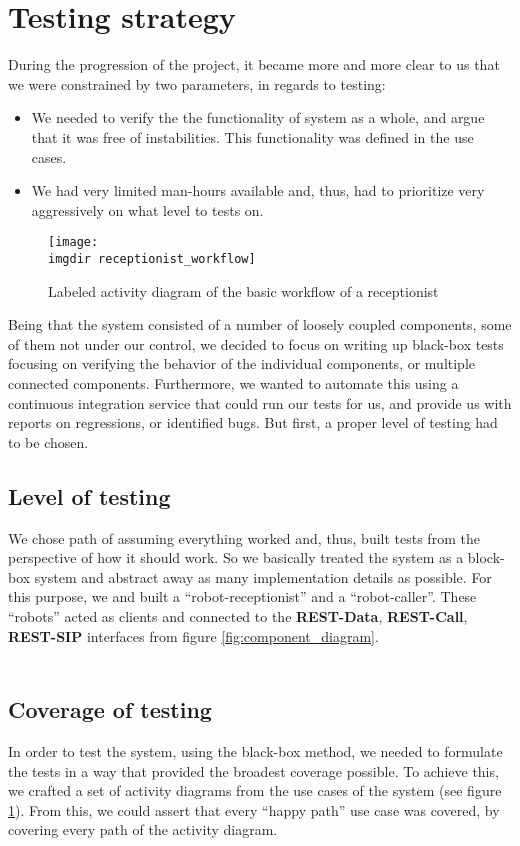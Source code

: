 \section{Testing strategy}
\label{sec:test}
During the progression of the project, it became more and more clear to us that we were constrained by two parameters, in regards to testing:
\begin{itemize}
  \item We needed to verify the the functionality of system as a whole, and argue that it was free of instabilities. This functionality was defined in the use cases.
  \item We had very limited man-hours available and, thus, had to prioritize very aggressively on what level to tests on.
\end{itemize}
\begin{figure}[ht]
\centering
\texttt{[image: \\imgdir receptionist\_workflow]}
\caption{Labeled activity diagram of the basic workflow of a receptionist}
\label{fig:receptionist_workflow}
\end{figure}
Being that the system consisted of a number of loosely coupled components, some of them not under our control, we decided to focus on writing up black-box tests focusing on verifying the behavior of the individual components, or multiple connected components.
Furthermore, we wanted to automate this using a continuous integration service that could run our tests for us, and provide us with reports on regressions, or identified bugs. But first, a proper level of testing had to be chosen.

\subsection{Level of testing}
\label{ssec:level-of-testing}
We chose path of assuming everything worked and, thus,  built tests from the perspective of how it should work. So we basically treated the system as a block-box system and abstract away as many implementation details as possible. For this purpose, we and built a ``robot-receptionist'' and a ``robot-caller''. These ``robots'' acted as clients and connected to the \textbf{REST-Data}, \textbf{REST-Call}, \textbf{REST-SIP} interfaces from figure \ref{fig:component_diagram}.\\\\

\subsection{Coverage of testing}
In order to test the system, using the black-box method, we needed to formulate the tests in a way that provided the broadest coverage possible. To achieve this, we crafted a set of activity diagrams from the use cases of the system (see figure \ref{fig:receptionist_workflow}). From this, we could assert that every ``happy path'' use case was covered, by covering every path of the activity diagram.

